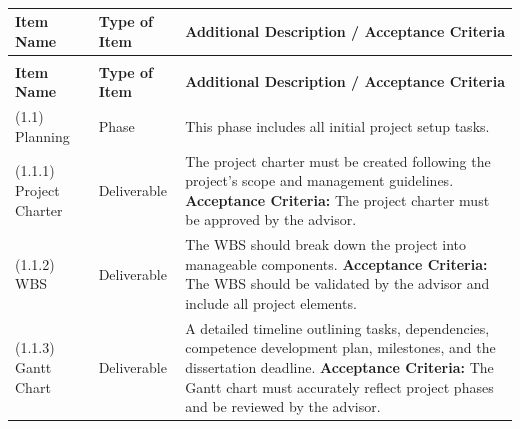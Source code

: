\begin{longtable}{|p{3cm}|p{2.5cm}|p{8cm}|}
    \caption{WBS dictionary} \label{tab:wbs-dictionary} \\ \hline
    \textbf{Item Name}             & \textbf{Type of Item} & \textbf{Additional Description / Acceptance Criteria}                                                                                                                                                                                                                                                                                                     \\ \hline
    \endfirsthead
    \caption*{} \\ \hline
    \textbf{Item Name}             & \textbf{Type of Item} & \textbf{Additional Description / Acceptance Criteria}                                                                                                                                                                                                                                                                                                     \\ \hline
    \endhead
    (1.1) Planning                 & Phase                 & This phase includes all initial project setup tasks.                                                                                                                                                                                                                                                                                                      \\ \hline
    (1.1.1) Project Charter        & Deliverable           & The project charter must be created following the project's scope and management guidelines. \newline \textbf{Acceptance Criteria:} The project charter must be approved by the advisor.                                                                                                                                                                  \\ \hline
    (1.1.2) \gls{WBS}              & Deliverable           & The \gls{WBS} should break down the project into manageable components. \newline \textbf{Acceptance Criteria:} The WBS should be validated by the advisor and include all project elements.                                                                                                                                                               \\ \hline
    (1.1.3) Gantt Chart            & Deliverable           & A detailed timeline outlining tasks, dependencies, competence development plan, milestones, and the dissertation deadline. \newline \textbf{Acceptance Criteria:} The Gantt chart must accurately reflect project phases and be reviewed by the advisor.                                                                                                  \\ \hline
    \hline 


\end{longtable}
